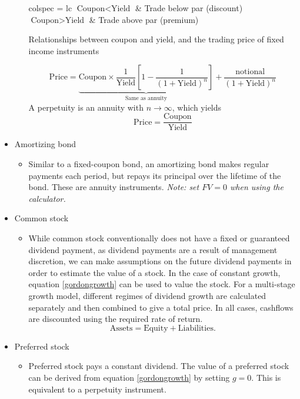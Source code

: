 \documentclass[../notes_compiled.tex]{subfiles}
\begin{document}
\begin{itemize}
\begin{itemize}
\begin{table}[h!]
\begin{tblr}{colspec = {lc}}
$\text{Coupon} < \text{Yield}$ & Trade below par (discount) \\
$\text{Coupon} > \text{Yield}$ & Trade above par (premium) \\ \hline[1.25pt]
\end{tblr}
\caption{Relationships between coupon and yield, and the trading price of fixed income instruments}
\end{table}
\begin{equation}
\text{Price} = \underbrace{\text{Coupon} \times \frac{1}{\text{Yield}} \left[1-\frac{1}{(1+\text{Yield})^{n}}\right]}_{\text{Same as annuity}} + \frac{\text{notional}}{(1+\text{Yield})^{n}}
\end{equation}
A perpetuity is an annuity with $n\rightarrow\infty$, which yields
\begin{equation}
\text{Price} = \frac{\text{Coupon}}{\text{Yield}}
\end{equation}

\end{itemize}
\item[] Amortizing bond
\begin{itemize}
\item[] Similar to a fixed-coupon bond, an amortizing bond makes regular payments each period, but repays its principal over the lifetime of the bond. These are annuity instruments. \emph{Note: set $FV=0$ when using the calculator.}
\end{itemize}
\item[] Common stock
\begin{itemize}
\item[] While common stock conventionally does not have a fixed or guaranteed dividend payment, as dividend payments are a result of management discretion, we can make assumptions on the future dividend payments in order to estimate the value of a stock. In the case of constant growth, equation \ref{gordongrowth} can be used to value the stock. For a multi-stage growth model, different regimes of dividend growth are calculated separately and then combined to give a total price. In all cases, cashflows are discounted using the required rate of return.
\begin{equation}
\text{Assets} = \text{Equity} + \text{Liabilities}.
\end{equation}
\end{itemize}
\item[] Preferred stock
\begin{itemize}
\item[] Preferred stock pays a constant dividend. The value of a preferred stock can be derived from equation \ref{gordongrowth} by setting $g=0$. This is equivalent to a perpetuity instrument.
\end{itemize}
\end{itemize}
\end{document}
